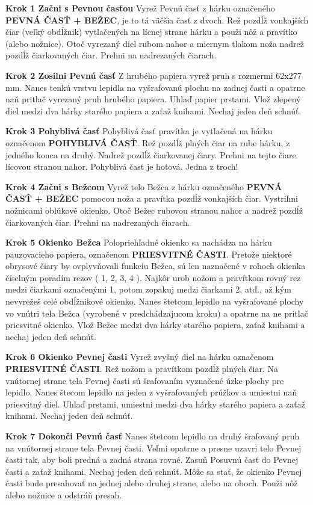 \begin{multicols*}{3}
{  \textbf{Krok 1 Začni s Pevnou časťou} Vyrež Pevnú časť z hárku označeného \textbf{PEVNÁ ČASŤ + BEŽEC}, je to tá väčšia časť z dvoch. Rež pozdĺž vonkajších čiar (veľký obdĺžnik) vytlačených na lícnej strane hárku a použi nôž a pravítko (alebo nožnice). Otoč vyrezaný diel rubom nahor a miernym tlakom noža nadrež pozdĺž čiarkovaných čiar. Prehni na nadrezaných čiarach.

  \textbf{Krok 2 Zosilni Pevnú časť} Z hrubého papiera vyrež pruh s rozmermi 62x277 mm. Nanes tenkú vrstvu lepidla na vyšrafovanú plochu na zadnej časti a opatrne naň pritlač vyrezaný pruh hrubého papiera. Uhlaď papier prstami. Vlož zlepený diel medzi dva hárky starého papiera a zaťaž knihami. Nechaj jeden deň schnúť.

  \textbf{Krok 3 Pohyblivá časť} Pohyblivá časť pravítka je vytlačená na hárku označenom \textbf{POHYBLIVÁ ČASŤ}. Rež pozdĺž plných čiar na rube hárku, z jedného konca na druhý. Nadrež pozdĺž čiarkovanej čiary. Prehni na tejto čiare lícovou stranou nahor. Pohyblivá časť je hotová. Jedna z troch!

  \textbf{Krok 4 Začni s Bežcom} Vyrež telo Bežca z hárku označeného \textbf{PEVNÁ ČASŤ + BEŽEC} pomocou noža a pravítka pozdĺž vonkajších čiar. Vystrihni nožnicami oblúkové okienko. Otoč Bežec rubovou stranou nahor a nadrež pozdĺž čiarkovaných čiar. Prehni na nadrezaných čiarach.

  \textbf{Krok 5 Okienko Bežca} Polopriehľadné okienko sa nachádza na hárku pauzovacieho papiera, označenom \textbf{PRIESVITNÉ ČASTI}. Pretože niektoré obrysové čiary by ovplyvňovali funkciu Bežca, sú len naznačené v rohoch okienka číselným poradím rezov ( 1, 2, 3, 4 ). Najkôr urob nožom a pravítkom rovný rez medzi čiarkami označenými 1, potom zopakuj medzi čiarkami 2, atď., až kým nevyrežeš celé obdĺžnikové okienko. Nanes štetcom lepidlo na vyšrafované plochy vo vnútri tela Bežca (vyrobené v predchádzajucom kroku) a opatrne na ne pritlač priesvitné okienko. Vlož Bežec medzi dva hárky starého papiera, zaťaž knihami a nechaj jeden deň schnúť.

  \textbf{Krok 6 Okienko Pevnej časti} Vyrež zvyšný diel na hárku označenom \textbf{PRIESVITNÉ ČASTI}. Rež nožom a pravítkom pozdĺž plných čiar. Na vnútornej strane tela Pevnej časti sú šrafovaním vyznačené úzke plochy pre lepidlo. Nanes štecom lepidlo na jeden z vyšrafovaných prúžkov a umiestni naň priesvitný diel. Uhlaď prstami, umiestni medzi dva hárky starého papiera a zaťaž knihami. Nechaj jeden deň schnúť.

  \textbf{Krok 7 Dokonči Pevnú časť} Nanes štetcom lepidlo na druhý šrafovaný pruh na vnútornej strane tela Pevnej časti. Veľmi opatrne a presne uzavri telo Pevnej časti tak, aby boli predná a zadná strana rovné. Zasuň Posuvnú časť do Pevnej časti a zaťaž knihami. Nechaj jeden deň schnúť.
Môže sa stať, že okienko Pevnej časti bude presahovať na jednej alebo druhej strane, alebo na oboch. Použi nôž alebo nožnice a odstráň presah.

}
\end{multicols*}

